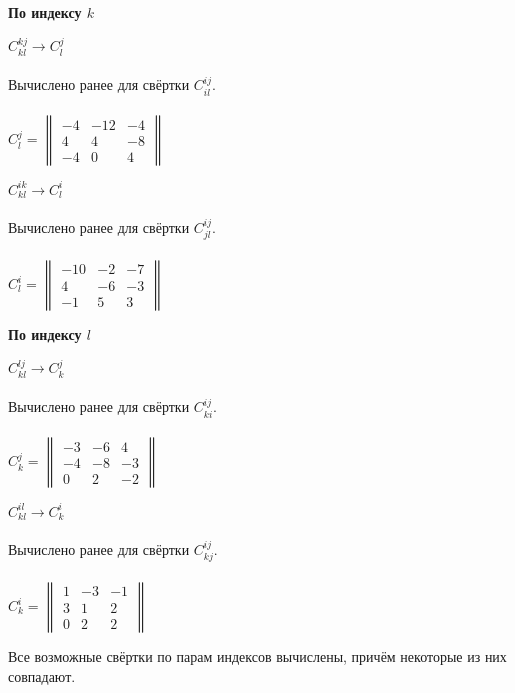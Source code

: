\documentclass{article}
\begin{document}
\begin{center}
\textbf{По индексу $k$}
\end{center}
\begin{multicols}{2}
\begin{center}
$C^{kj}_{kl} \rightarrow C^{j}_{l}$ \\ \, \\
Вычислено ранее для свёртки $C^{ij}_{il}$. \\ \, \\
$C^{j}_{l} = \begin{Vmatrix}-4 & -12 & -4 \\ 4 & 4 & -8 \\ -4 & 0 & 4\end{Vmatrix}$
\end{center}
\begin{center}
$C^{ik}_{kl} \rightarrow C^{i}_{l}$ \\ \, \\
Вычислено ранее для свёртки $C^{ij}_{jl}$. \\ \, \\
$C^{i}_{l} = \begin{Vmatrix}-10 & -2 & -7 \\ 4 & -6 & -3 \\ -1 & 5 & 3\end{Vmatrix}$
\end{center}
\end{multicols}
\begin{center}
\textbf{По индексу $l$}
\end{center}
\begin{multicols}{2}
\begin{center}
$C^{lj}_{kl} \rightarrow C^{j}_{k}$ \\ \, \\
Вычислено ранее для свёртки $C^{ij}_{ki}$. \\ \, \\
$C^{j}_{k} = \begin{Vmatrix}-3 & -6 & 4 \\ -4 & -8 & -3 \\ 0 & 2 & -2\end{Vmatrix}$
\end{center}
\begin{center}
$C^{il}_{kl} \rightarrow C^{i}_{k}$ \\ \, \\
Вычислено ранее для свёртки $C^{ij}_{kj}$. \\ \, \\
$C^{i}_{k} = \begin{Vmatrix}1 & -3 & -1 \\ 3 & 1 & 2 \\ 0 & 2 & 2\end{Vmatrix}$
\end{center}
\end{multicols}
Все возможные свёртки по парам индексов вычислены, причём некоторые из них совпадают.
\end{document}
